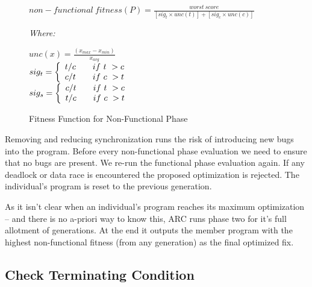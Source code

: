 \documentclass{llncs}
\begin{document}
\begin{figure}
\begin{footnotesize}
\begin{center}
$non-functional\ fitness(P) = \frac{worst\ score}{[sig_t \times unc(t)] + [sig_c \times unc(c)]}$
\end{center}
\vspace{0.1cm} \textit{Where:} \vspace{0.1cm}
\end{footnotesize}
\begin{tiny}
\begin{center}
$unc(x) = \frac{(x_{max} - x_{min})}{x_{avg}}$ \\ \vspace{0.2cm}
$
  sig_t = \left\{
  \begin{array}{l l}
    t/c & \quad if\ t\ > c \\
    c/t & \quad if\ c\ > t \\
  \end{array} \right.
$ \\ \vspace{0.2cm}
$
  sig_s = \left\{
  \begin{array}{l l}
    c/t & \quad if\ t\ > c \\
    t/c & \quad if\ c\ > t \\
  \end{array} \right.
$ \\
\end{center}
\end{tiny}
\caption{Fitness Function for Non-Functional Phase}
\label{fig:nonfunctional_fitness}
\end{figure}

Removing and reducing synchronization runs the risk of introducing new bugs
into the program. Before every non-functional phase evaluation we need to
ensure that no bugs are present. We re-run the functional phase evaluation
again. If any deadlock or data race is encountered the proposed optimization is
rejected. The individual's program is reset to the previous generation.

As it isn't clear when an individual's program reaches its maximum optimization
-- and there is no a-priori way to know this, ARC runs phase two for it's full
allotment of generations. At the end it outputs the member program with the
highest non-functional fitness (from any generation) as the final optimized
fix.

\subsection{Check Terminating Condition}
\label{sec:check_terminating_condition}
\end{document}
